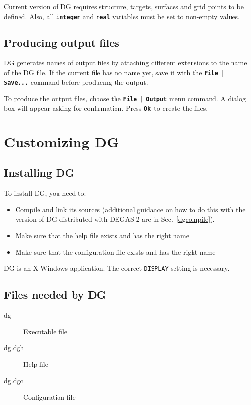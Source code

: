 \documentclass[12pt]{report}
\begin{document}
Current version of DG requires structure, targets, surfaces and grid
points to be defined. Also, all \textbf{\texttt{integer}} and
\textbf{\texttt{real}} variables must be set to non-empty values.

\section{Producing output files}

DG generates names of output files by attaching different extensions
to the name of the DG file. If the current file has no name yet, save
it with the \textbf{\texttt{File \begin{math}\vert{}\end{math} Save...}}
command before producing the output.

To produce the output files, choose the
\textbf{\texttt{File \begin{math}\vert{}\end{math} Output}} menu command.
A dialog box will appear asking for confirmation. Press
\textbf{\texttt{Ok }}to create the files.

\chapter{Customizing DG}

\section{Installing DG}

To install DG, you need to:
\begin{itemize}
  \item Compile and link its sources (additional 
guidance on how to do this with the version of DG 
distributed with DEGAS 2 are in Sec.~\ref{dgcompile}).
  \item Make sure that the help file exists and has the right name
  \item Make sure that the configuration file exists and has the right name
\end{itemize}

DG is an X Windows application. The correct \verb+DISPLAY+ setting is
necessary.

\section{Files needed by DG}

\begin{description}
  \item[dg] Executable file
  \item[dg.dgh] Help file
  \item[dg.dgc] Configuration file
\end{description}
\end{document}
